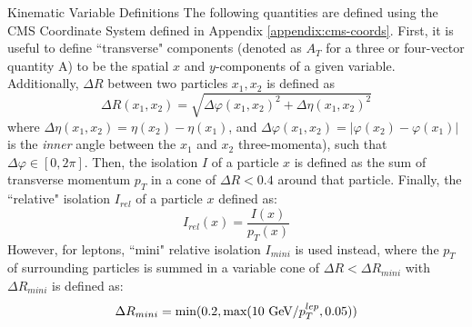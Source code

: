 \begin{section}{Kinematic Variable Definitions}\label{var-defs}
The following quantities are defined using the CMS Coordinate System defined in Appendix \ref{appendix:cms-coords}. First, it is useful to define ``transverse" components (denoted as $A_{T}$ for a three or four-vector quantity A) to be the spatial $x$ and $y$-components of a given variable. Additionally, $\Delta R$ between two particles $x_1, x_2$ is defined as
\begin{equation}
    \Delta R(x_1, x_2) = \sqrt{\Delta\varphi(x_1, x_2)^{2}+\Delta\eta(x_1, x_2)^{2}}
\end{equation}
\noindent where $\Delta\eta(x_1, x_2) = \eta(x_2)-\eta(x_1)$, and $\Delta\varphi(x_1, x_2) = |\varphi(x_2) - \varphi(x_1)|$ is the \textit{inner} angle between the $x_1$ and $x_2$ three-momenta), such that $\Delta\varphi \in [0, 2\pi]$. Then, the isolation $I$ of a particle $x$ is defined as the sum of transverse momentum $p_{T}$ in a cone of $\Delta R < 0.4$\cite{cite-iso-dR} around that particle. Finally, the ``relative" isolation $I_{rel}$ of a particle $x$ defined as:
\begin{equation}
    I_{rel}(x) = \frac{I(x)}{p_{T}(x)}
\end{equation}
However, for leptons, ``mini" relative isolation $I_{mini}$ is used instead, where the $p_{T}$ of surrounding particles is summed in a variable cone of $\Delta R < \Delta R_{mini}$ with $\Delta R_{mini}$ is defined as:
\begin{equation}
    \Delta R_{mini} = \textnormal{min}(0.2, \textnormal{max}(10\textnormal{ GeV}/p_{T}^{lep}, 0.05))
\end{equation}
\end{section}

